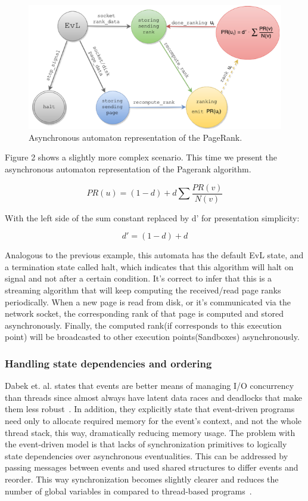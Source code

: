 \documentclass[10pt,reprint]{socc14}
\begin{document}
\begin{figure}	
	\centering
	\includegraphics[scale=0.55]{AutomatonPageRank}
	\caption{Asynchronous automaton representation of the PageRank.}
\end{figure}


Figure 2 shows a slightly more complex scenario. This time we present the asynchronous automaton representation of the Pagerank algorithm. 

\begin{equation}
	PR(u) =(1-d) + d\sum \frac{PR(v)}{N(v)}
\end{equation}

With the left side of the sum constant replaced by d’ for presentation simplicity:

\begin{equation}
  d' =(1-d) + d
\end{equation}

Analogous to the previous example, this automata has the default EvL state, and a termination state called halt, which indicates that this algorithm will halt on signal and not after a certain condition. It’s correct to infer that this is a streaming algorithm that will keep computing the received/read page ranks periodically. When a new page is read from disk, or it’s communicated via the network socket, the corresponding rank of that page is computed and stored asynchronously. Finally, the computed rank(if corresponds to this execution point) will be broadcasted to other execution points(Sandboxes) asynchronously.

\subsubsection{Handling state dependencies and ordering}
Dabek et. al. states that events are better means of managing I/O concurrency than threads since almost always have latent data races and deadlocks that make them less robust~\cite{Dabek2002}. In addition, they explicitly state that event-driven programs need only to allocate required memory for the event’s context, and not the whole thread stack, this way, dramatically reducing memory usage. The problem with the event-driven model is that lacks of synchronization primitives to logically state dependencies over asynchronous eventualities. This can be addressed by passing messages between events and used shared structures to differ events and reorder. This way synchronization becomes slightly clearer and reduces the number of global variables in compared to thread-based programs~\cite{Haller2009}.
\end{document}
